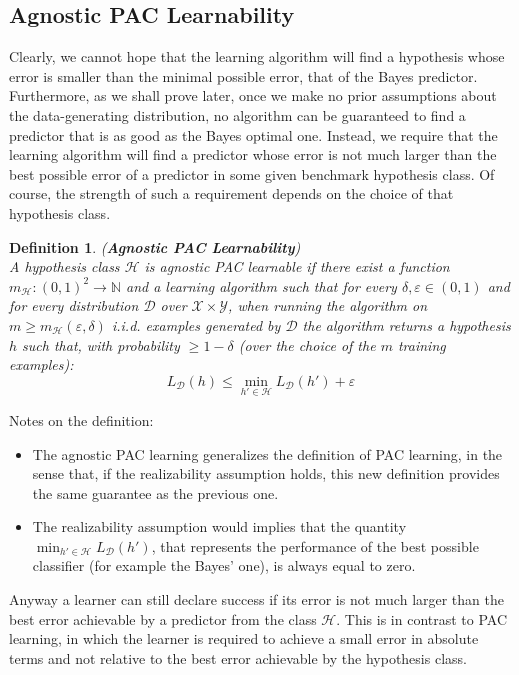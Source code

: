 \documentclass[12pt]{report}
\theoremstyle{plain}
\newtheorem{DEF}{Definition}
\newcommand\mcl[1]{\mathcal{#1}}
\begin{document}
\begin{flushleft}
\section{Agnostic PAC Learnability}
Clearly, we cannot hope that the learning algorithm will find a hypothesis whose error is smaller than the minimal possible error, that of the Bayes predictor. Furthermore, as we shall prove later, once we make no prior assumptions about the data-generating distribution, no algorithm can be guaranteed to find a predictor that is as good as the Bayes optimal one. Instead, we require that the learning algorithm will find a predictor whose error is not much larger than the best possible error of a predictor in some given benchmark hypothesis class. Of course, the strength of such a requirement depends on the choice of that hypothesis class.\\
\begin{DEF}(\textbf{Agnostic PAC Learnability})\\
A hypothesis class $\mcl{H}$ is agnostic PAC learnable if there exist a function $m_\mcl{H}:(0,1)^2\to\mathds{N}$ and a learning algorithm such that for every $\delta,\varepsilon\in (0,1)$ and for every distribution $\mcl{D}$ over $\mcl{X}\times\mcl{Y}$, when running the algorithm on $m\geq m_\mcl{H}(\varepsilon,\delta)$ i.i.d. examples generated by $\mcl{D}$ the algorithm returns a hypothesis $h$ such that, with probability $\geq 1-\delta$ (over the choice of the $m$ training examples):
\[ L_\mcl{D}(h)\leq\min_{h'\in\mcl{H}}L_\mcl{D}(h')+\varepsilon \]
\label{def:agnostic_PAC_l}
\end{DEF}
Notes on the definition:
\begin{itemize}
\item The agnostic PAC learning generalizes the definition of PAC learning, in the sense that, if the realizability assumption holds, this new definition provides the same guarantee as the previous one.
\item The realizability assumption would implies that the quantity $\min_{h'\in\mcl{H}}L_\mcl{D}(h')$, that represents the performance of the best possible classifier (for example the Bayes' one), is always equal to zero.
\end{itemize}
Anyway a learner can still declare success if its error is not much larger than the best error achievable by a predictor from the class $\mcl{H}$. This is in contrast to PAC learning, in which the learner is required to achieve a small error in absolute terms and not relative to the best error achievable by the hypothesis class.\\ 


\end{flushleft}
\end{document}
